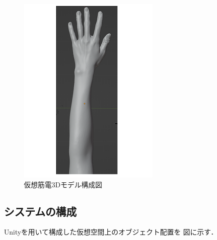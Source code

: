 \documentclass{ltjsarticle}
\begin{document}
\begin{figure}[H]
\begin{minipage}{0.23\columnwidth}
		\end{minipage}
		\hspace{0.1\columnwidth}
		\begin{minipage}{0.3\columnwidth}
		\centering
		\includegraphics[width = \columnwidth]{figs/handmesh_rear2.png}
		\end{minipage}
		\caption{仮想筋電3Dモデル構成図}
		\label{fig:VRhand}
		\end{figure}
		\vspace{-30pt}

	\subsection{システムの構成}
		Unityを用いて構成した仮想空間上のオブジェクト配置を
		図に示す．
\end{document}
